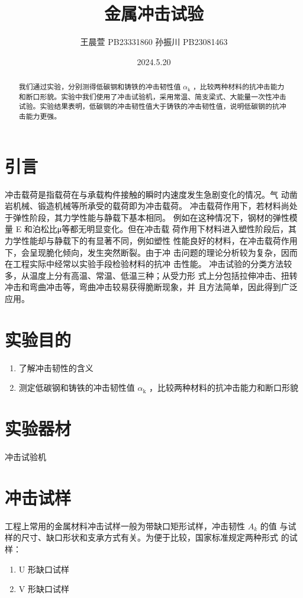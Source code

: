 \documentclass{article}
\title{\heiti\zihao{2} 金属冲击试验}
\author{\songti 王晨萱 PB23331860  孙振川  PB23081463  }
\date{2024.5.20}
\begin{document}
    \maketitle

\begin{abstract}
    我们通过实验，分别测得低碳钢和铸铁的冲击韧性值 $\alpha_{\mathrm{k}}$ ，比较两种材料的抗冲击能力和断口形貌。实验中我们使用了冲击试验机，采用常温、简支梁式、大能量一次性冲击试验。实验结果表明，低碳钢的冲击韧性值大于铸铁的冲击韧性值，说明低碳钢的抗冲击能力更强。

    
\end{abstract}
\section{引言}
冲击载荷是指载荷在与承载构件接触的瞬时内速度发生急剧变化的情况。气
动凿岩机械、锻造机械等所承受的载荷即为冲击载荷。 
冲击载荷作用下，若材料尚处于弹性阶段，其力学性能与静载下基本相同。
例如在这种情况下，钢材的弹性模量 E 和泊松比μ等都无明显变化。但在冲击载
荷作用下材料进入塑性阶段后，其力学性能却与静载下的有显著不同，例如塑性
性能良好的材料，在冲击载荷作用下，会呈现脆化倾向，发生突然断裂。由于冲
击问题的理论分析较为复杂，因而在工程实际中经常以实验手段检验材料的抗冲
击性能。 
冲击试验的分类方法较多，从温度上分有高温、常温、低温三种；从受力形
式上分包括拉伸冲击、扭转冲击和弯曲冲击等，弯曲冲击较易获得脆断现象，并
且方法简单，因此得到广泛应用。


\section{实验目的}
\begin{enumerate}
    \item 了解冲击韧性的含义 
    \item 测定低碳钢和铸铁的冲击韧性值 $\alpha_{\mathrm{k}}$ ，比较两种材料的抗冲击能力和断口形貌
\end{enumerate}

\section{实验器材}

冲击试验机
 
\section{冲击试样}
工程上常用的金属材料冲击试样一般为带缺口矩形试样，冲击韧性 $A_k$ 的值
与试样的尺寸、缺口形状和支承方式有关。为便于比较，国家标准规定两种形式
的试样：   
    \begin{enumerate}
        \item U 形缺口试样
        \item V 形缺口试样
    \end{enumerate} 
\end{document}
